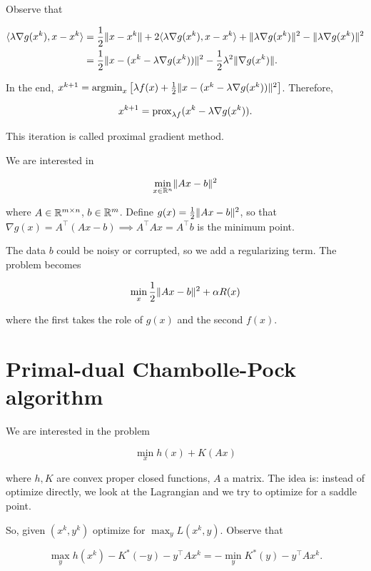 Observe that

\begin{align*}
    \langle \lambda \nabla g(x^k), x - x^k\rangle &= \frac12 \lVert x - x^k \rVert + 2\langle \lambda \nabla g(x^k), x - x^k\rangle + \lVert \lambda\nabla g(x^k) \rVert^2 - \lVert \lambda \nabla g(x^k) \rVert^2 \\
    &= \frac12 \lVert x - (x^k - \lambda \nabla g(x^k)) \rVert^2 - \frac12 \lambda^2 \lVert \nabla g(x^k) \rVert.
\end{align*}

In the end, $ x^{k+1} = \mathrm{argmin}_x \left[ \lambda f(x) + \frac12 \lVert x - (x^k -\lambda \nabla g(x^k)) \rVert^2\right]$. Therefore, 

\[ x^{k+1} = \mathrm{prox}_{\lambda f}(x^k -\lambda \nabla g(x^k)). \]

This iteration is called proximal gradient method.

\begin{example}

    We are interested in 

    \[ \min_{x \in {\mathbb{R}^n}} \lVert Ax - b \rVert^2 \]

    where $A \in \mathbb{R}^{m \times n}$, $b \in \mathbb{R}^m$. Define $g(x) = \frac12\lVert Ax -b \rVert^2$, so that $\nabla g(x) = A^\top \left(Ax - b\right) \implies A^\top A x = A^\top b$ is the minimum point. 
    
    The data $b$ could be noisy or corrupted, so we add a regularizing term. The problem becomes 

    \[ \min_x \frac12 \lVert Ax-b \rVert^2 +\alpha R(x) \]

    where the first takes the role of $g(x)$ and the second $f(x)$.
    
\end{example}

\section{Primal-dual Chambolle-Pock algorithm}

We are interested in the problem 

\[ \min_x h(x) + K(Ax) \]

where $h,K$ are convex proper closed functions, $A$ a matrix. The idea is: instead of optimize directly, we look at the Lagrangian and we try to optimize for a saddle point. 

So, given $(x^k, y^k)$ optimize for $\max_y L(x^k,y)$. Observe that 

\[
    \max_y h(x^k) - K^*(-y) - y^\top A x^k = -\min_y K^*(y) - y^\top A x^k.
\]

